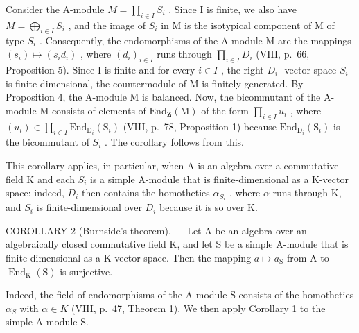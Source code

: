 Consider the A-module \(M = \prod_{i \in I} S_i\) . Since I is finite, we also have \(M = \bigoplus_{i \in I} S_i\) , and the image of \(S_i\) in M is the isotypical component of M of type \(S_i\) . Consequently, the endomorphisms of the A-module M are the mappings \((s_i) \mapsto (s_i d_i)\) , where \((d_i)_{i \in I}\) runs through \(\prod_{i \in I} D_i\) (VIII, p.~66, Proposition 5). Since I is finite and for every \(i \in I\) , the right \(D_i\) -vector space \(S_i\) is finite-dimensional, the countermodule of M is finitely generated. By Proposition 4, the A-module M is balanced. Now, the bicommutant of the A-module M consists of elements of \(\text{End}_{\mathbf{Z}}(\text{M})\) of the form \(\prod_{i \in I} u_i\) , where \((u_i) \in \prod_{i \in I} \text{End}_{\text{D}_i}(\text{S}_i)\) (VIII, p.~78, Proposition 1) because \(\text{End}_{\text{D}_i}(\text{S}_i)\) is the bicommutant of \(S_i\) . The corollary follows from this.

This corollary applies, in particular, when A is an algebra over a commutative field K and each \(S_{i}\) is a simple A-module that is finite-dimensional as a K-vector space: indeed, \(D_{i}\) then contains the homotheties \(\alpha_{S_{i}}\) , where \(\alpha\) runs through K, and \(S_{i}\) is finite-dimensional over \(D_{i}\) because it is so over K.

COROLLARY 2 (Burnside's theorem). --- Let A be an algebra over an algebraically closed commutative field K, and let S be a simple A-module that is finite-dimensional as a K-vector space. Then the mapping \(a \mapsto a_{\mathrm{S}}\) from A to \(\operatorname{End}_{\mathrm{K}}(\mathrm{S})\) is surjective.

Indeed, the field of endomorphisms of the A-module S consists of the homotheties \(\alpha_{S}\) with \(\alpha \in K\) (VIII, p.~47, Theorem 1). We then apply Corollary 1 to the simple A-module S.


